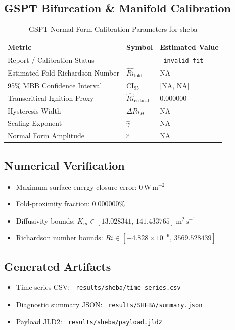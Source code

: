 \subsection{GSPT Bifurcation \& Manifold Calibration}
\begin{table}[htbp]
\centering
\caption{GSPT Normal Form Calibration Parameters for sheba}
\label{tab:gspt_calibration_sheba_sheba_160x2m_12h_report}
\begin{tabular}{lll}
\hline
{\bfseries Metric} & {\bfseries Symbol} & {\bfseries Estimated Value} \\
\hline
Report / Calibration Status & --- & \texttt{ invalid\_fit } \\
Estimated Fold Richardson Number & $\hat{Ri}_{\mathrm{fold}}$ & NA \\
95\% MBB Confidence Interval & CI$_{95}$ & [NA, NA] \\
Transcritical Ignition Proxy & $\hat{Ri}_{\mathrm{critical}}$ & 0.000000 \\
Hysteresis Width & $\Delta Ri_H$ & NA \\
Scaling Exponent & $\hat{\gamma}$ & NA \\
Normal Form Amplitude & $\hat{c}$ & NA \\
\hline
\end{tabular}
\end{table}

\subsection{Numerical Verification}
\begin{itemize}
  \item Maximum surface energy closure error:
  $0\,\mathrm{W\,m^{-2}}$
  \item Fold-proximity fraction:
  $0.000000\%$
  \item Diffusivity bounds:
  $K_m \in [13.028341,\,141.433765]~\mathrm{m^2\,s^{-1}}$
  \item Richardson number bounds:
  $Ri \in [-4.828 \times 10^{-6},\,3569.528439]$
\end{itemize}

\subsection{Generated Artifacts}
\begin{itemize}
  \item Time-series CSV: \texttt{ results/sheba/time\_series.csv }
  \item Diagnostic summary JSON: \texttt{ results/SHEBA/summary.json }
  \item Payload JLD2: \texttt{ results/sheba/payload.jld2 }
\end{itemize}

